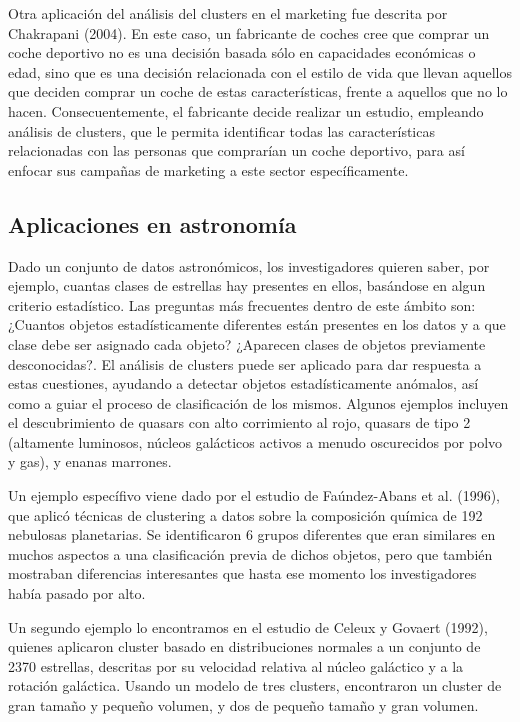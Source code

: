 Otra aplicación del análisis del clusters en el marketing fue descrita por Chakrapani (2004). En este caso, un fabricante de coches cree que comprar un coche deportivo no es una decisión basada sólo en capacidades económicas o edad, sino que es una decisión relacionada con el estilo de vida que llevan aquellos que deciden comprar un coche de estas características, frente a aquellos que no lo hacen. Consecuentemente, el fabricante decide realizar un estudio, empleando análisis de clusters, que le permita identificar todas las características relacionadas con las personas que comprarían un coche deportivo, para así enfocar sus campañas de marketing a este sector específicamente.

\subsection{Aplicaciones en astronomía}

Dado un conjunto de datos astronómicos, los investigadores quieren saber, por ejemplo, cuantas clases de estrellas hay presentes en ellos, basándose en algun criterio estadístico. Las preguntas más frecuentes dentro de este ámbito son: ¿Cuantos objetos estadísticamente diferentes están presentes en los datos y a que clase debe ser asignado cada objeto? ¿Aparecen clases de objetos previamente desconocidas?. El análisis de clusters puede ser aplicado para dar respuesta a estas cuestiones, ayudando a detectar objetos estadísticamente anómalos, así como a guiar el proceso de clasificación de los mismos. Algunos ejemplos incluyen el descubrimiento de quasars con alto corrimiento al rojo, quasars de tipo 2 (altamente luminosos, núcleos galácticos activos a menudo oscurecidos por polvo y gas), y enanas marrones.

Un ejemplo específivo viene dado por el estudio de Faúndez-Abans et al. (1996), que aplicó técnicas de clustering a datos sobre la composición química de 192 nebulosas planetarias. Se identificaron 6 grupos diferentes que eran similares en muchos aspectos a una clasificación previa de dichos objetos, pero que también mostraban diferencias interesantes que hasta ese momento los investigadores había pasado por alto.

Un segundo ejemplo lo encontramos en el estudio de Celeux y Govaert (1992), quienes aplicaron cluster basado en distribuciones normales a un conjunto de 2370 estrellas, descritas por su velocidad relativa al núcleo galáctico y a la rotación galáctica. Usando un modelo de tres clusters, encontraron un cluster de gran tamaño y pequeño volumen, y dos de pequeño tamaño y gran volumen.

